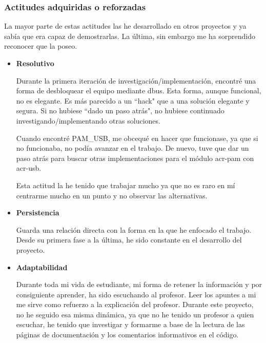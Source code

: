 \documentclass[twoside, titlepage, 12pt, a4paper]{article}
\begin{document}
\subsubsection{Actitudes adquiridas o reforzadas}
La mayor parte de estas actitudes las he desarrollado en otros proyectos y ya sabía que era capaz de demostrarlas. La última, sin embargo me ha sorprendido reconocer que la poseo.
\begin{itemize}
	\item{\textbf{Resolutivo}}\par Durante la primera iteración de investigación/implementación, encontré una forma de desbloquear el equipo mediante \gls{dbus}. Esta forma, aunque funcional, no es elegante. Es más parecido a un ``hack" que a una solución elegante y segura. Si no hubiese ``dado un paso atrás", no hubiese continuado investigando/implementando otras soluciones. \par Cuando encontré PAM\_USB, me obcequé en hacer que funcionase, ya que si no funcionaba, no podía avanzar en el trabajo. De nuevo, tuve que dar un paso atrás para buscar otras implementaciones para el módulo \gls{acr-pam} con \gls{acr-usb}.\par
		Esta actitud la he tenido que trabajar mucho ya que no es raro en mí centrarme mucho en un punto y no observar las alternativas.
	\item{\textbf{Persistencia}}\par Guarda una relación directa con la forma en la que he enfocado el trabajo. Desde su primera fase a la última, he sido constante en el desarrollo del proyecto.
	\item{\textbf{Adaptabilidad}}\par Durante toda mi vida de estudiante, mi forma de retener la información y por consiguiente aprender, ha sido escuchando al profesor. Leer los apuntes a mi me sirve como refuerzo a la explicación del profesor. Durante este proyecto, no he seguido esa misma dinámica, ya que no he tenido un profesor a quien escuchar, he tenido que investigar y formarme a base de la lectura de las páginas de documentación y los comentarios informativos en el código.
\end{itemize}
\end{document}

